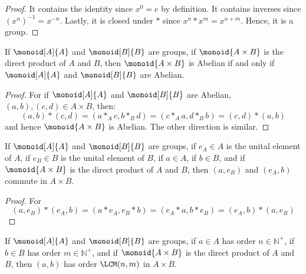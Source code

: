 \documentclass{article}                                                        %
\begin{document}
        \begin{proof}
            It contains the identity since $x^{0}=e$ by definition. It contains
            inverses since $(x^{n})^{\minus{1}}=x^{\minus{n}}$. Lastly, it
            is closed under $*$ since $x^{n}*x^{m}=x^{n+m}$. Hence, it is a
            group.
        \end{proof}
        \begin{theorem}
            If $\monoid[A]{A}$ and $\monoid[B]{B}$ are groups, if
            $\monoid{A\times{B}}$ is the direct product of $A$ and $B$, then
            $\monoid{A\times{B}}$ is Abelian if and only if
            $\monoid[A]{A}$ and $\monoid[B]{B}$ are Abelian.
        \end{theorem}
        \begin{proof}
            For if $\monoid[A]{A}$ and $\monoid[B]{B}$ are Abelian,
            $(a,b),(c,d)\in{A}\times{B}$, then:
            \begin{equation}
                (a,b)*(c,d)=(a*_{A}c,b*_{B}d)=
                (c*_{A}a,d*_{B}b )=(c,d)*(a,b)
            \end{equation}
            and hence $\monoid{A\times{B}}$ is Abelian. The other direction is
            similar.
        \end{proof}
        \begin{theorem}
            If $\monoid[A]{A}$ and $\monoid[B]{B}$ are groups, if $e_{A}\in{A}$
            is the unital element of $A$, if $e_{B}\in{B}$ is the unital element
            of $B$, if $a\in{A}$, if $b\in{B}$, and if $\monoid{A\times{B}}$
            is the direct product of $A$ and $B$, then $(a,e_{B})$ and
            $(e_{A},b)$ commute in $A\times{B}$.
        \end{theorem}
        \begin{proof}
            For
            \begin{equation}
                (a,e_{B})*(e_{A},b)=(a*e_{A},e_{B}*b)
                =(e_{A}*a,b*e_{B})=(e_{A},b)*(a,e_{B})
            \end{equation}
        \end{proof}
        \begin{theorem}
            If $\monoid[A]{A}$ and $\monoid[B]{B}$ are groups, if $a\in{A}$ has
            order $n\in\mathbb{N}^{+}$, if $b\in{B}$ has order
            $m\in\mathbb{N}^{+}$, and if $\monoid{A\times{B}}$ is the direct
            product of $A$ and $B$, then $(a,b)$ has order $\LCM(n,m)$ in
            $A\times{B}$.
        \end{theorem}
\end{document}
